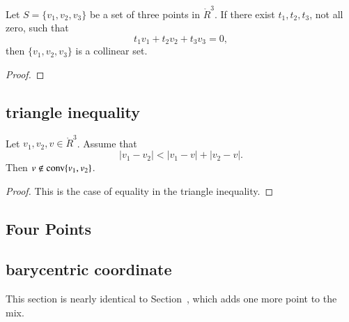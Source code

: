 \begin{tarskidata}
\begin{tarski}

\begin{lemma}
Let $S = \{v_1,v_2,v_3\}$ be a set of three
points in $\ring{R}^3$.  If there exist $t_1,t_2,t_3$, not all zero,
such that  $$
           t_1 v_1 + t_2 v_2 + t_3 v_3 = 0,
           $$
then $\{v_1,v_2,v_3\}$ is a collinear set.
\end{lemma}

\begin{proof}
\end{proof}
\end{tarski}









\begin{tarski}
\subsection{triangle inequality}

\begin{lemma} 
Let $v_1,v_2,v\in\ring{R}^3$.  
Assume that
	$$|v_1-v_2| < |v_1-v| + |v_2 - v|.$$
Then $v\not\in{\operatorname{conv}}\{v_1,v_2\}$.
\end{lemma}

\begin{proof}
This is the case of equality in the triangle inequality.
\end{proof}
\end{tarski}







\begin{tarski}
\section{Four Points}
\subsection{barycentric coordinate}
This section is nearly identical to Section~, which adds one more point
to the mix.


\end{tarski}
\end{tarskidata}
